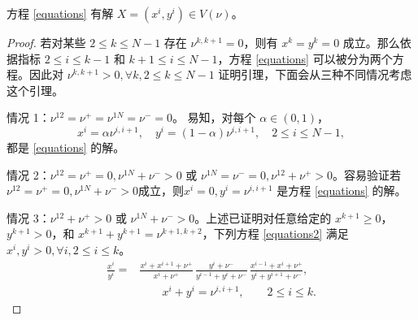 \begin{lemma}\label{lemma:existence for equations solution}
	方程 \eqref{equations} 有解 $X=(x^i,y^i)\in V(\nu)$。
\end{lemma}
\begin{proof}
    若对某些 $2\le k\le N-1$ 存在 $\nu^{k,k+1}=0$，则有 $x^{k}=y^{k}=0$ 成立。那么依据指标 $2\le i\le k-1$ 和 $k+1\le i\le N-1$，方程 \eqref{equations} 可以被分为两个方程。因此对 $\nu^{k,k+1}>0, \forall k, 2\le k\le N-1$ 证明引理，下面会从三种不同情况考虑这个引理。

    情况 1：$\nu^{12}=\nu^{+}=\nu^{1N}=\nu^-=0$。
    易知，对每个 $\alpha\in (0,1)$，
    \begin{equation*}
        x^{i}=\alpha\nu^{i,i+1},\quad y^{i}=(1-\alpha)\nu^{i,i+1},\quad 2\le i\le N-1,
    \end{equation*}
    都是 \eqref{equations} 的解。

    情况 2：$\nu^{12}=\nu^{+}=0,\nu^{1N}+\nu^{-}>0$ 或 $\nu^{1N}=\nu^{-}=0,\nu^{12}+\nu^{+}>0$。容易验证若 $\nu^{12}=\nu^{+}=0,\nu^{1N}+\nu^{-}>0$成立，则$x^{i}=0,y^{i}=\nu^{i,i+1}$ 是方程 \eqref{equations} 的解。

    情况 3：$\nu^{12}+\nu^{+}>0$ 或 $\nu^{1N}+\nu^{-}>0$。上述已证明对任意给定的 $x^{k+1}\ge 0$，$y^{k+1}>0$，和 $x^{k+1}+y^{k+1}=\nu^{k+1,k+2}$，下列方程 \eqref{equations2} 满足 $x^{i},y^{i}> 0, \forall i, 2\le i\le k$。
    \begin{equation}\label{equations2}
        \begin{split}
            \frac{x^{i}}{y^{i}}
            =&\frac{x^{i}+x^{i+1}+\nu^+}{x^{i}+\nu^+}\, \frac{y^{i}+\nu^-}{y^{i-1}+y^{i}+\nu^-}
            \,\frac{x^{i-1}+x^{i}+\nu^+}{y^{i}+y^{i+1}+\nu^-},\\
            &\qquad x^{i} + y^{i} = \nu^{i,i+1},\qquad 2\le i\le k.
        \end{split}
    \end{equation}


\end{proof}
